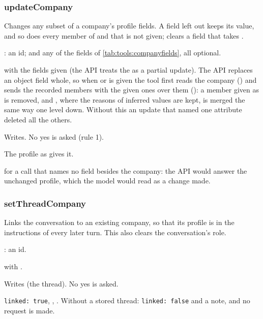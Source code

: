 \subsubsection{updateCompany}\label{sec:tools:updateCompany}
\begin{description}[style=multiline, leftmargin=19mm, labelwidth=17mm, labelsep=2mm,
  font=\sffamily\bfseries\footnotesize\color{ink}, itemsep=1pt, topsep=2pt, before=\raggedright]
  \item[Does] Changes any subset of a company's profile fields. A field left out keeps its
    value, and so does every member of  and  that is
    not given;  clears a field that takes .
  \item[Input] : an id; and any of the fields of \cref{tab:tools:companyfields},
    all optional.
  \item[Calls]  with the fields given (the API treats the
     as a partial update). The API replaces an object field whole, so when
     or  is given the tool first reads the company
    () and sends the recorded members with the given ones over
    them (): a member given as  is removed, and
    , where the reasons of inferred values are kept, is merged the
    same way one level down. Without this an update that named one attribute deleted all the
    others.
  \item[Kind] Writes. No yes is asked (rule 1).
  \item[Returns] The profile as  gives it.
  \item[Errors]  for a call that names no field besides the company:
    the API would answer the unchanged profile, which the model would read as a change made.
\end{description}

\subsubsection{setThreadCompany}\label{sec:tools:setThreadCompany}
\begin{description}[style=multiline, leftmargin=19mm, labelwidth=17mm, labelsep=2mm,
  font=\sffamily\bfseries\footnotesize\color{ink}, itemsep=1pt, topsep=2pt, before=\raggedright]
  \item[Does] Links the conversation to an existing company, so that its profile is in the
    instructions of every later turn. This also clears the conversation's role.
  \item[Input] : an id.
  \item[Calls]  with .
  \item[Kind] Writes (the thread). No yes is asked.
  \item[Returns] \texttt{linked: true}, , . Without a stored
    thread: \texttt{linked: false} and a note, and no request is made.
\end{description}

